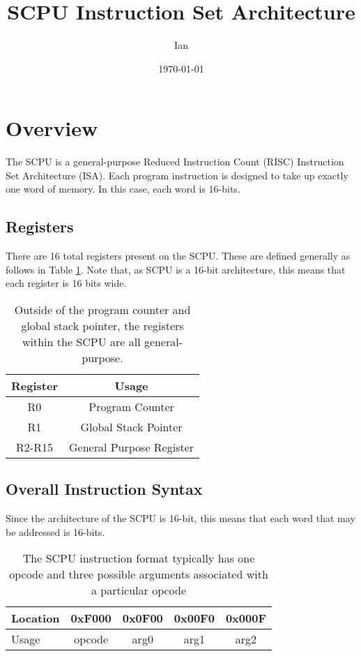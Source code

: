 \documentclass{article}
\title{SCPU Instruction Set Architecture}
\author{Ian}
\date{\today}
\begin{document}
\maketitle

\section{Overview}


The SCPU is a general-purpose Reduced Instruction Count (RISC) Instruction Set Architecture (ISA). Each program instruction is designed to take up exactly one word of memory. In this case, each word is 16-bits.

\subsection{Registers}

There are 16 total registers present on the SCPU. These are defined generally as follows in Table \ref{table:register-setup}. Note that, as SCPU is a 16-bit architecture, this means that each register is 16 bits wide.

\begin{table}[h!]
	\centering
	\begin{tabular}{c|c}
		\hline
		Register & Usage \\
		\hline
		R0 & Program Counter \\
		R1 & Global Stack Pointer \\
		R2-R15 & General Purpose Register \\
		\hline
	\end{tabular}
	\caption{Outside of the program counter and global stack pointer, the registers within the SCPU are all general-purpose.}
	\label{table:register-setup}
\end{table}

\subsection{Overall Instruction Syntax}

Since the architecture of the SCPU is 16-bit, this means that each word that may be addressed is 16-bits.

\begin{table}[h!]
	\centering
	\begin{tabular}{l|cccc}
		\hline
		Location & 0xF000 & 0x0F00 & 0x00F0 & 0x000F \\
		\hline
		Usage & opcode & arg0 & arg1 & arg2 \\
		\hline
	\end{tabular}
	\caption{The SCPU instruction format typically has one opcode and three possible arguments associated with a particular opcode}
	\label{table:instruction-formatting}
\end{table}
\end{document}

